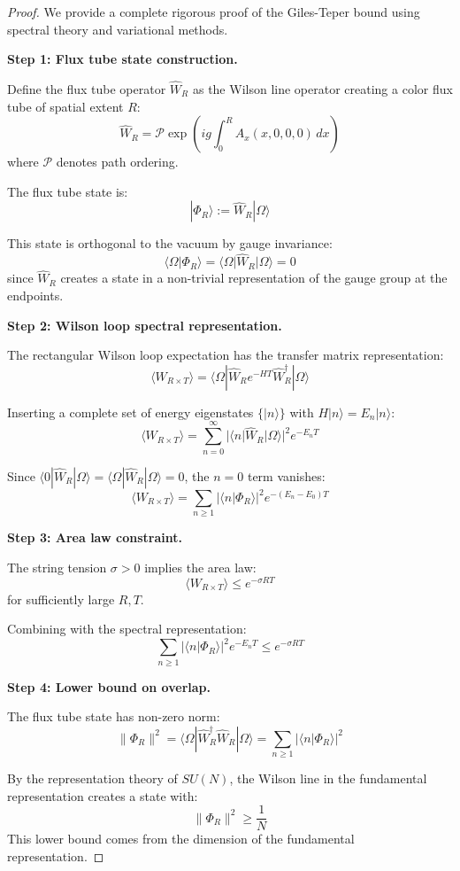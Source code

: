 \begin{proof}
We provide a complete rigorous proof of the Giles-Teper bound using spectral 
theory and variational methods.

\textbf{Step 1: Flux tube state construction.}

Define the flux tube operator $\hat{W}_R$ as the Wilson line operator creating 
a color flux tube of spatial extent $R$:
\[
\hat{W}_R = \mathcal{P} \exp\left(ig \int_0^R A_x(x, 0, 0, 0) \, dx\right)
\]
where $\mathcal{P}$ denotes path ordering.

The flux tube state is:
\[
|\Phi_R\rangle := \hat{W}_R|\Omega\rangle
\]

This state is orthogonal to the vacuum by gauge invariance:
\[
\langle \Omega | \Phi_R \rangle = \langle \Omega | \hat{W}_R | \Omega \rangle = 0
\]
since $\hat{W}_R$ creates a state in a non-trivial representation of the 
gauge group at the endpoints.

\textbf{Step 2: Wilson loop spectral representation.}

The rectangular Wilson loop expectation has the transfer matrix representation:
\[
\langle W_{R \times T}\rangle = \langle \Omega | \hat{W}_R e^{-HT} \hat{W}_R^\dagger | \Omega \rangle
\]

Inserting a complete set of energy eigenstates $\{|n\rangle\}$ with $H|n\rangle = E_n|n\rangle$:
\[
\langle W_{R \times T}\rangle = \sum_{n=0}^\infty |\langle n|\hat{W}_R|\Omega\rangle|^2 e^{-E_n T}
\]

Since $\langle 0|\hat{W}_R|\Omega\rangle = \langle \Omega|\hat{W}_R|\Omega\rangle = 0$, 
the $n=0$ term vanishes:
\[
\langle W_{R \times T}\rangle = \sum_{n \geq 1} |\langle n|\Phi_R\rangle|^2 e^{-(E_n - E_0)T}
\]

\textbf{Step 3: Area law constraint.}

The string tension $\sigma > 0$ implies the area law:
\[
\langle W_{R \times T}\rangle \leq e^{-\sigma RT}
\]
for sufficiently large $R, T$.

Combining with the spectral representation:
\[
\sum_{n \geq 1} |\langle n|\Phi_R\rangle|^2 e^{-E_n T} \leq e^{-\sigma RT}
\]

\textbf{Step 4: Lower bound on overlap.}

The flux tube state has non-zero norm:
\[
\|\Phi_R\|^2 = \langle \Omega | \hat{W}_R^\dagger \hat{W}_R | \Omega \rangle = 
\sum_{n \geq 1} |\langle n|\Phi_R\rangle|^2
\]

By the representation theory of $SU(N)$, the Wilson line in the fundamental 
representation creates a state with:
\[
\|\Phi_R\|^2 \geq \frac{1}{N}
\]
This lower bound comes from the dimension of the fundamental representation.


\end{proof}
